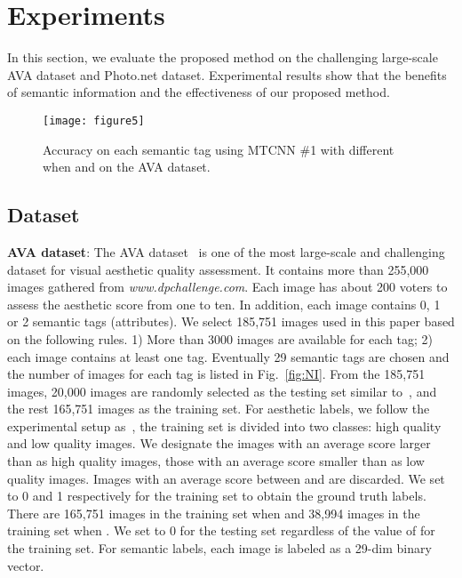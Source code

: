 \documentclass[journal]{IEEEtran}
\begin{document}
\section{Experiments \label{sec:exp}}
In this section, we evaluate the proposed method on the challenging large-scale AVA dataset and Photo.net dataset. Experimental results show that the benefits of semantic information and the effectiveness of our proposed method.
\begin{figure*}
  \centering
\texttt{[image: figure5]}\\
\caption{Accuracy on each semantic tag using MTCNN \#1 with different  when  and  on the AVA dataset.  }
  \label{fig:tag_r}
\end{figure*}
\subsection{Dataset}

\noindent\textbf{AVA dataset}: The AVA dataset~\cite{Murray12} is one of the most large-scale and challenging dataset for visual aesthetic quality assessment. It contains more than 255,000 images gathered from \emph{www.dpchallenge.com}. Each image has about 200 voters to assess the aesthetic score from one to ten. In addition, each image contains 0, 1 or 2 semantic tags (attributes). We select 185,751 images used in this paper based on the following rules. 1) More than 3000 images are available for each tag; 2) each image contains at least one tag. Eventually 29 semantic tags are chosen and the number of images for each tag is listed in Fig.~\ref{fig:NI}. From the 185,751 images, 20,000 images are randomly selected as the testing set similar to~\cite{lu14}, and the rest 165,751 images as the training set. For aesthetic labels, we follow the experimental setup as~\cite{Murray12,lu14}, the training set is divided into two classes: high quality and low quality images. We designate the images with an average score larger than  as high quality images, those with an average score smaller than  as low quality images. Images with an average score between  and  are discarded. We set  to 0 and 1 respectively for the training set to obtain the ground truth labels. There are 165,751 images in the training set when  and 38,994 images in the training set when . We set  to 0 for the testing set regardless of the value of  for the training set. For semantic labels, each image is labeled as a 29-dim binary vector.
\end{document}

